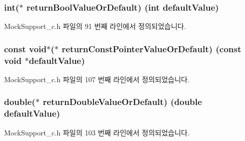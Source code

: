 \subsubsection[{\texorpdfstring{return\+Bool\+Value\+Or\+Default}{returnBoolValueOrDefault}}]{\setlength{\rightskip}{0pt plus 5cm}int($\ast$ return\+Bool\+Value\+Or\+Default) (int default\+Value)}\hypertarget{struct_s_mock_actual_call__c_add9da47e3578bf177c1aa0710d977413}{}\label{struct_s_mock_actual_call__c_add9da47e3578bf177c1aa0710d977413}


Mock\+Support\+\_\+c.\+h 파일의 91 번째 라인에서 정의되었습니다.

\subsubsection[{\texorpdfstring{return\+Const\+Pointer\+Value\+Or\+Default}{returnConstPointerValueOrDefault}}]{\setlength{\rightskip}{0pt plus 5cm}const void$\ast$($\ast$ return\+Const\+Pointer\+Value\+Or\+Default) (const void $\ast$default\+Value)}\hypertarget{struct_s_mock_actual_call__c_addb8be61d99e230985589991a3789da2}{}\label{struct_s_mock_actual_call__c_addb8be61d99e230985589991a3789da2}


Mock\+Support\+\_\+c.\+h 파일의 107 번째 라인에서 정의되었습니다.

\subsubsection[{\texorpdfstring{return\+Double\+Value\+Or\+Default}{returnDoubleValueOrDefault}}]{\setlength{\rightskip}{0pt plus 5cm}double($\ast$ return\+Double\+Value\+Or\+Default) (double default\+Value)}\hypertarget{struct_s_mock_actual_call__c_af0c6afe5e9c03b93b3f636894f06f7fd}{}\label{struct_s_mock_actual_call__c_af0c6afe5e9c03b93b3f636894f06f7fd}


Mock\+Support\+\_\+c.\+h 파일의 103 번째 라인에서 정의되었습니다.

